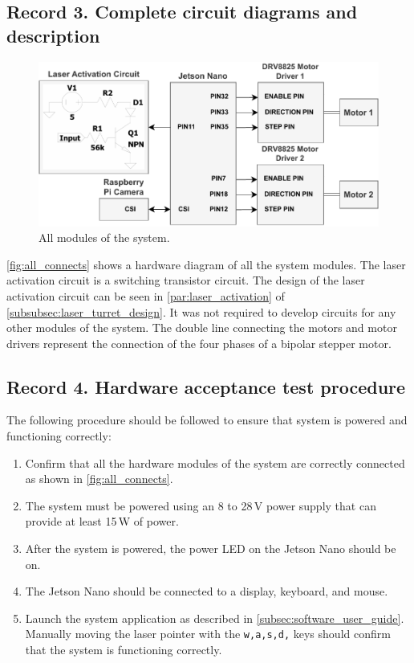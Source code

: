 \newpage
\subsection{Record 3. Complete circuit diagrams and description}
\begin{figure}[H]
  \centering
  \includegraphics[width=\textwidth]{figures/all_system_connects.pdf}
  \caption{All modules of the system.}
  \label{fig:all_connects}
\end{figure}
\autoref{fig:all_connects} shows a hardware diagram of all the system modules. The laser activation circuit is a switching transistor circuit. The design of the laser activation circuit can be seen in \autoref{par:laser_activation} of \autoref{subsubsec:laser_turret_design}. It was not required to develop circuits for any other modules of the system. The double line connecting the motors and motor drivers represent the connection of the four phases of a bipolar stepper motor.

\newpage
\subsection{Record 4. Hardware acceptance test procedure}
The following procedure should be followed to ensure that system is powered and functioning correctly:
\begin{enumerate}
  \item Confirm that all the hardware modules of the system are correctly connected as shown in \autoref{fig:all_connects}.
  \item The system must be powered using an 8 to 28\,V power supply that can provide at least 15\,W of power.
  \item After the system is powered, the power LED on the Jetson Nano should be on.
  \item The Jetson Nano should be connected to a display, keyboard, and mouse.
  \item Launch the system application as described in \autoref{subsec:software_user_guide}. Manually moving the laser pointer with the \texttt{w,a,s,d,} keys should confirm that the system is functioning correctly.
\end{enumerate}


